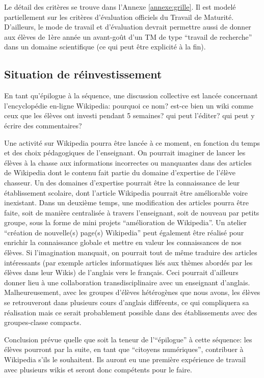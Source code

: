 \documentclass[11pt,bibliography=totoc]{scrartcl}
\newcommand\ajout[1]{{\color{blue} #1}}
\begin{document}
Le détail des critères se trouve dans l'Annexe \ref{annexe:grille}. Il est
modelé partiellement sur les critères d'évaluation officiels du Travail de
Maturité. D'ailleurs, le mode de travail et d'évaluation devrait permettre aussi
de donner aux élèves de 1ère année un avant-goût d'un TM de type ``travail de
recherche'' dans un domaine scientifique (ce qui peut être explicité à la fin).

\subsection{Situation de réinvestissement}
En tant qu'épilogue à la séquence, une discussion collective est lancée
concernant l'encyclopédie en-ligne Wikipedia: pourquoi ce nom? est-ce bien un
wiki comme ceux que les élèves ont investi pendant 5 semaines? qui peut
l'éditer? qui peut y écrire des commentaires?

Une activité sur Wikipedia pourra être lancée à ce moment, en fonction du temps
et des choix pédagogiques de l'enseignant.  On pourrait imaginer de lancer les
élèves à la chasse aux informations incorrectes ou manquantes dans des articles
de Wikipedia dont le contenu fait partie du domaine d'expertise de l'élève
chasseur. Un des domaines d'expertise pourrait être la connaissance de leur
établissement scolaire, dont l'article Wikipedia pourrait être améliorable voire
inexistant.  Dans un deuxième temps, une modification des articles pourra être
faite, soit de manière centralisée à travers l'enseignant, soit de nouveau par
petits groupe, sous la forme de mini projets ``amélioration de Wikipedia''.
\ajout {Un atelier ``création de nouvelle(s) page(s) Wikipedia'' peut également
  être réalisé pour enrichir la connaissance globale et mettre en valeur les
  connaissances de nos élèves. Si l'imagination manquait, on pourrait tout de
  même traduire des articles intéressants (par exemple articles informatiques
  liés aux thèmes abordés par les élèves dans leur Wikis) de l'anglais vers le
  français. Ceci pourrait d'ailleurs donner lieu à une collaboration
  transdisciplinaire avec un enseignant d'anglais. Malheureusement, avec les
  groupes d'élèves hétérogènes que nous avons, les élèves se retrouveront dans
  plusieurs cours d'anglais différents, ce qui compliquera sa réalisation mais
  ce serait probablement possible dans des établissements avec des
  groupes-classe compacts.  }

Conclusion prévue quelle que soit la teneur de l'``épilogue'' à cette séquence:
les élèves pourront par la suite, en tant que ``citoyens numériques'',
contribuer à Wikipedia s'ils le souhaitent. Ils auront eu une première
expérience de travail avec plusieurs wikis et seront donc compétents pour le
faire.
\end{document}
